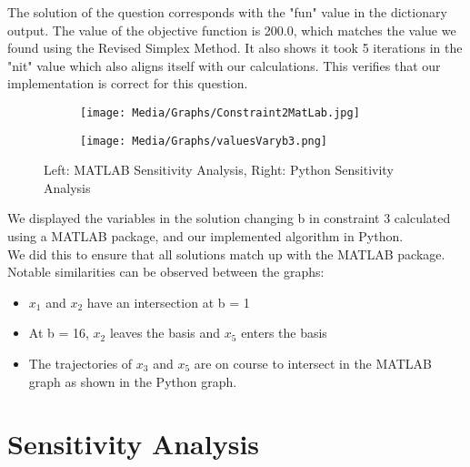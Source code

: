 \documentclass{article}
\numberwithin{equation}{section}
\begin{document}
The solution of the question corresponds with the "fun" value in the dictionary output. The value of the objective function is 200.0, which matches the value we found using the Revised Simplex Method. It also shows it took 5 iterations in the "nit" value which also aligns itself with our calculations. This verifies that our implementation is correct for this question.
\newpage
\begin{figure}
    \centering
    \begin{subfigure}{.5\textwidth}
      \centering
      \texttt{[image: Media/Graphs/Constraint2MatLab.jpg]}
    \end{subfigure}%
    \begin{subfigure}{.5\textwidth}
      \centering
      \texttt{[image: Media/Graphs/valuesVaryb3.png]}
    \end{subfigure}
    \caption{Left: MATLAB Sensitivity Analysis, Right: Python Sensitivity Analysis}
\end{figure}
We displayed the variables in the solution changing b in constraint 3 calculated using a MATLAB package, and our implemented algorithm in Python. \\
We did this to ensure that all solutions match up with the MATLAB package. \\
Notable similarities can be observed between the graphs:
\begin{itemize}
    \item $x_1$ and $x_2$ have an intersection at b = 1
    \item At b = 16, $x_2$ leaves the basis and $x_5$ enters the basis
    \item The trajectories of $x_3$ and $x_5$ are on course to intersect in the MATLAB graph as shown in the Python graph.
\end{itemize}
\newpage
\section{Sensitivity Analysis}
\end{document}
